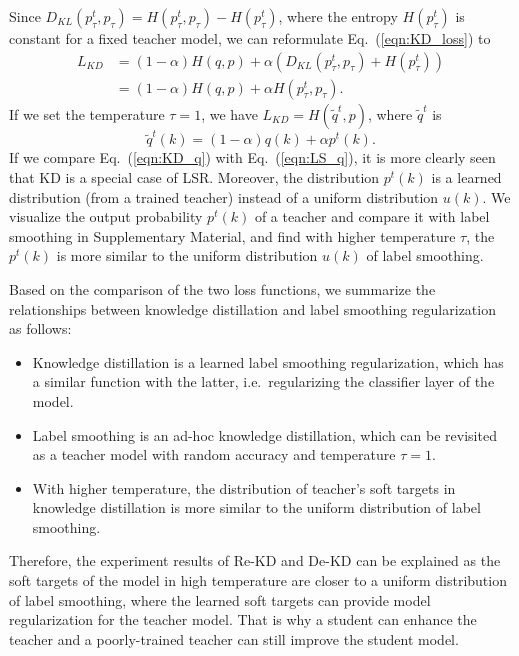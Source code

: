 \documentclass[10pt,twocolumn,letterpaper]{article}
\begin{document}
Since $ D_{KL}(p^{t}_{\tau}, p_{\tau})=H(p^{t}_{\tau}, p_{\tau})-H(p^{t}_{\tau})$, where the entropy $H(p^{t}_{\tau})$ is constant for a  fixed  teacher model, we can reformulate Eq.~(\ref{eqn:KD_loss}) to
\begin{equation}
\begin{aligned}
    L_{KD} 
    & = (1-\alpha)H(q, p) + \alpha (D_{KL}(p^{t}_{\tau}, p_{\tau})+ H(p^{t}_{\tau}))\\
    &= (1-\alpha)H(q, p) + \alpha H(p^{t}_{\tau}, p_{\tau}).
\end{aligned}
\end{equation}
If we set the temperature $\tau=1$, we have $L_{KD} = H(\tilde{q}^{t}, p)$, where $\tilde{q}^{t}$ is
\begin{equation}
\tilde{q}^{t}(k)=(1-\alpha)q(k) + \alpha p^{t}(k).
\label{eqn:KD_q}
\end{equation}
If we compare Eq.~(\ref{eqn:KD_q}) with Eq.~(\ref{eqn:LS_q}), it is more clearly seen that KD is a special case of LSR. Moreover, the distribution $p^{t}(k)$ is a learned distribution (from a trained teacher) instead of a uniform distribution $u(k)$. We visualize the output probability $p^{t}(k)$ of a teacher and compare it with label smoothing in Supplementary Material, and find with higher temperature $\tau$, the $p^{t}(k)$ is more similar to the uniform distribution $u(k)$ of label smoothing.

Based on the comparison of the two loss functions, we summarize the relationships between knowledge distillation and label smoothing regularization as follows:
\begin{itemize}
\item Knowledge distillation is a learned label smoothing regularization, which has a similar function with the latter, i.e.\ regularizing the classifier layer of the model.
\item Label smoothing is an ad-hoc knowledge distillation, which can be revisited as a teacher model with random accuracy and temperature $\tau=1$.
\item With higher temperature, the distribution of teacher's soft targets in knowledge distillation is more similar to the uniform distribution of label smoothing.
\end{itemize}

Therefore, the experiment results of Re-KD and De-KD can be explained as the soft targets of the model in high temperature are closer to a uniform distribution of label smoothing, where the learned soft targets can provide model regularization for the teacher model. That is why a student can enhance the teacher and a poorly-trained teacher can still improve the student model. 
\end{document}
